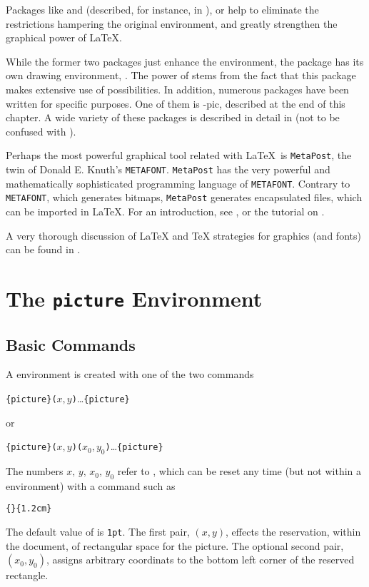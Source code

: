 Packages like  and  (described, for instance, in \companion), or
 help to eliminate the restrictions hampering the original  
environment, and greatly strengthen the graphical power of \LaTeX.

While the former two packages just enhance the  environment, the 
package has its own drawing environment, . The power of  stems
from the fact that this package makes extensive use of \PSi{} possibilities.
In addition, numerous packages have been written for specific purposes. One of them is
\texorpdfstring{\Xy}{Xy}-pic, described at the end of this chapter. A wide variety of these
packages is described in detail in \graphicscompanion{} (not to be confused with \companion).

Perhaps the most powerful graphical tool related with \LaTeX\ is \texttt{MetaPost}, the twin of
Donald E. Knuth's \texttt{METAFONT}. \texttt{MetaPost} has the very powerful and 
mathematically sophisticated programming language of \texttt{METAFONT}. Contrary to \texttt{METAFONT},
which generates bitmaps, \texttt{MetaPost} generates encapsulated \PSi{} files, 
which can be imported in \LaTeX. For an introduction, see \hobby, or the tutorial on \cite{ursoswald}.

A very thorough discussion of \LaTeX{} and \TeX{} strategies for graphics (and fonts) can 
be found in \hoenig.

\section{The \texttt{picture} Environment}

\subsection{Basic Commands}

A  environment is created with one of the two commands
\begin{lscommand}
\verb|{picture}(|$x,y$\verb|)|\ldots{}\verb|{picture}|
\end{lscommand}
\noindent or
\begin{lscommand}
\verb|{picture}(|$x,y$\verb|)(|$x_0,y_0$\verb|)|\ldots{}\verb|{picture}|
\end{lscommand}
The numbers $x,\,y,\,x_0,\,y_0$ refer to , which can be reset any time
(but not within a  environment) with a command such as
\begin{lscommand}
\verb|{|\verb|}{1.2cm}|
\end{lscommand}
The default value of  is \texttt{1pt}. The first pair, $(x,y)$, effects
the reservation, within the document, of rectangular space for the picture. The optional
second pair, $(x_0,y_0)$, assigns arbitrary coordinats to the bottom left corner of the
reserved rectangle. 

